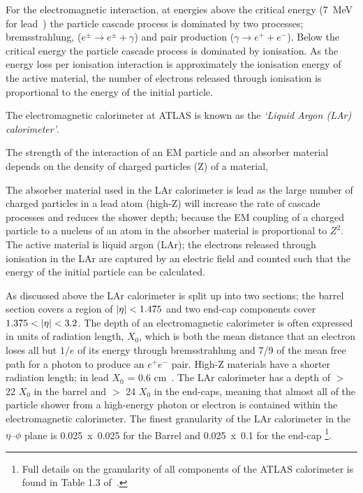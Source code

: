 For the electromagnetic interaction, at energies above the critical energy (\SI{7}{\MeV} for lead~\cite{obj-bjets_PDG})
the particle cascade process is dominated by two processes;
bremsstrahlung, ($e^{\pm} \to e^{\pm} + \gamma$) and pair production ($\gamma \to e^{+} + e^{-}$).
Below the critical energy the particle cascade process is dominated by ionisation.
As the energy loss per ionisation interaction is approximately the ionisation energy of the active material,
the number of electrons released through ionisation is proportional to the energy of the initial particle.

The electromagnetic calorimeter at ATLAS is known as the \textit{`Liquid Argon (LAr) calorimeter'}.

The strength of the interaction of an EM particle and an absorber material
depends on the density of charged particles (Z) of a material,

The absorber material used in the LAr calorimeter is lead
as the large number of charged particles in a lead atom (high-Z) will increase the rate of cascade processes and reduces the shower depth;
because the EM coupling of a charged particle to a nucleus of an atom in the absorber material is proportional to $Z^2$.
The active material is liquid argon (LAr);
the electrons released through ionisation in the LAr are captured by an electric field and counted
such that the energy of the initial particle can be calculated.

As discussed above the LAr calorimeter is split up into two sections;
the barrel section covers a region of $|\eta|\nobreak<\nobreak1.475$ and two end-cap components cover $1.375\nobreak<\nobreak|\eta|\nobreak<\nobreak3.2$.
The depth of an electromagnetic calorimeter is often expressed in units of radiation length, $X_{0}$,
which is both the mean distance that an electron loses all but  $1/e$ of its energy through bremsstrahlung
and 7/9 of the mean free path for a photon to produce an $e^+e^-$ pair.
High-Z materials have a shorter radiation length; in lead $X_0$ = 0.6 cm~\cite{obj-bjets_PDG}.
The LAr calorimeter has a depth of $>$ 22 $X_{0}$ in the barrel and $>$ 24 $X_{0}$ in the end-caps,
meaning that almost all of the particle shower from a high-energy photon
or electron is contained within the electromagnetic calorimeter.
The finest granularity of the LAr calorimeter in the $\eta$--$\phi$ plane
is \mbox{0.025~x~0.025} for the Barrel and 0.025~x~0.1 for the end-cap
\footnote{Full details on the granularity of all components of the ATLAS calorimeter is found in Table 1.3 of~\cite{det-ATLAS_Exp}.}. 

